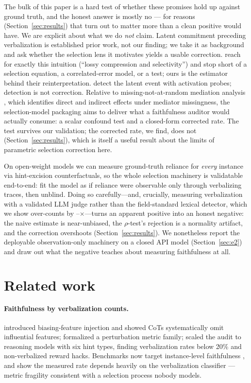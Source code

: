 \documentclass[10pt]{article}
\begin{document}
The bulk of this paper is a hard test of whether these promises hold up
against ground truth, and the honest answer is mostly no --- for reasons
(Section~\ref{sec:results}) that turn out to matter more than a clean positive
would have. We are explicit about what we do \emph{not} claim. Latent
commitment preceding verbalization is established prior work, not our finding;
we take it as background and ask whether the selection lens it motivates
yields a usable correction.
\citet{zaman2025} reach for exactly this intuition (``lossy compression and
selectivity'') and stop short of a selection equation, a correlated-error
model, or a test; ours is the estimator behind their reinterpretation.
\citet{rationalization2026} detect the latent event with activation probes;
detection is not correction. Relative to missing-not-at-random mediation
analysis \citep{zuo2024mediation}, which identifies direct and indirect
effects under mediator missingness, the selection-model packaging aims to
deliver what a faithfulness auditor would actually consume: a scalar confound
test and a closed-form corrected rate. The test survives our validation; the
corrected rate, we find, does not (Section~\ref{sec:results}), which is itself
a useful result about the limits of parametric selection correction here.

On open-weight models we can measure ground-truth reliance for
\emph{every} instance via hint-excision counterfactuals, so the whole
selection machinery is validatable end-to-end: fit the model as if reliance
were observable only through verbalizing traces, then unblind. Doing so
carefully---and, crucially, measuring verbalization with a validated LLM judge
rather than the field-standard lexical detector, which we show over-counts by
\QNeOvercount--\QQwOvercount$\times$---turns an apparent positive into an
honest negative: the naive estimate is near-unbiased, the $\rho$-test's
rejection is a normality artifact, and the correction overshoots
(Section~\ref{sec:results}). We nonetheless report the deployable
observation-only machinery on a closed API model (Section~\ref{sec:e2}) and
draw out what the negative teaches about measuring faithfulness at all.

\section{Related work}
\label{sec:related}

\paragraph{Faithfulness by verbalization counts.} \citet{turpin2023}
introduced biasing-feature injection and showed CoTs systematically omit
influential features; \citet{lanham2023} formalized a perturbation metric
family; \citet{chen2025reasoning} scaled the audit to reasoning models with
six hint types, finding verbalization rates below 20\% and non-verbalized
reward hacks. Benchmarks now target instance-level faithfulness
\citep{arcese2025faithcot}, and \citet{young2026measuring} show the measured
rate depends heavily on the verbalization classifier --- metric fragility
consistent with a selection process nobody models.
\end{document}
